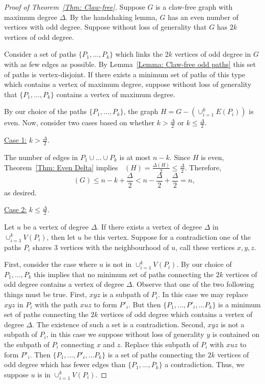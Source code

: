 \documentclass[11pt]{amsart}
\theoremstyle{definition}
\DeclareMathOperator{\re}{f_{re}}
\begin{document}
\begin{proof}[Proof of Theorem~\ref{Thm: Claw-free}]
Suppose $G$ is a claw-free graph with maximum degree $\Delta$.
By the handshaking lemma, $G$ has an even number of vertices with odd degree.
Suppose without loss of generality that $G$ 
has $2k$ vertices of odd degree. 

Consider a set of paths $\{P_1, \ldots, P_{k}\}$ which links the $2k$ vertices of odd degree in $G$ with as few edges as possible. 
By Lemma~\ref{Lemma: Claw-free odd paths} this set of paths is vertex-disjoint.
If there exists a minimum set of paths of this type which contains a vertex of maximum degree, suppose without loss of generality that 
$\{P_1, \ldots, P_{k}\}$ contains a vertex of maximum degree.


By our choice of the paths $\{P_1, \ldots, P_{k}\}$,
the graph $H = G - (\cup_{i=1}^k E(P_i))$ is even.
Now, consider two cases based on whether $k > \frac{\Delta}{2}$ or $k \leq \frac{\Delta}{2}$.

\medskip
\noindent \underline{Case 1:} $k > \frac{\Delta}{2}$. 
\medskip

The number of edges in $P_1\cup\dots\cup P_k$ is at most $n-k$.
Since $H$ is even, 
Theorem~\ref{Thm: Even Delta}
implies 
$\re(H) = \frac{\Delta(H)}{2} \leq \frac{\Delta}{2}$.
Therefore,
\[
\re(G) \leq n - k + \frac{\Delta}{2} < n - \frac{\Delta}{2} + \frac{\Delta}{2} = n,
\]
as desired.

\medskip
\noindent \underline{Case 2:} $k \leq \frac{\Delta}{2}$. 
\medskip

Let $u$ be a vertex of degree $\Delta$. 
If there exists a vertex of degree $\Delta$ in $\cup_{i=1}^k V(P_i)$, then let $u$ be this vertex.
Suppose for a contradiction one of the paths $P_i$ shares 3 vertices with the neighbourhood of $u$,
call these vertices $x,y,z$.

First, consider the case where $u$ is not in $\cup_{i=1}^k V(P_i)$.
By our choice of $P_1,\dots, P_k$ this implies that no minimum set of paths connecting the $2k$ vertices of odd degree
contains a vertex of degree $\Delta$.
Observe that one of the two following things must be true.
First, $xyz$ is a subpath of $P_i$. 
In this case we may replace $xyz$ in $P_i$ with the path $xuz$ to form $P'_i$.
But then $\{P_1,\dots, P'_i,\dots P_k\}$ is a minimum set of paths connecting the $2k$ vertices of odd degree which
contains a vertex of degree $\Delta$. The existence of such a set is a contradiction.
Second, $xyz$ is not a subpath of $P_i$, in this case we suppose without loss of generality $y$ is contained on the subpath of $P_i$ connecting $x$ and $z$.
Replace this subpath of $P_i$ with $xuz$ to form $P'_i$.
Then $\{P_1,\dots, P'_i,\dots P_k\}$ is a set of paths connecting the $2k$ vertices of odd degree which has fewer edges than $\{P_1,\dots, P_k\}$
a contradiction.
Thus, we suppose $u$ is in $\cup_{i=1}^k V(P_i)$.


\end{proof}
\end{document}
